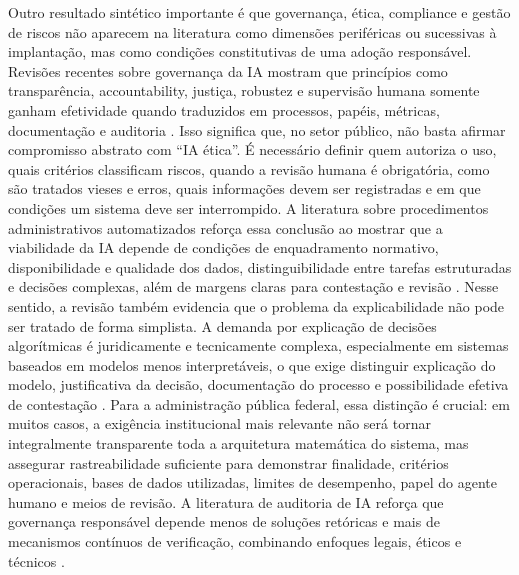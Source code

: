 \documentclass[12pt,a4paper]{article}
\begin{document}
Outro resultado sintético importante é que governança, ética, compliance e gestão de riscos não aparecem na literatura como dimensões periféricas ou sucessivas à implantação, mas como condições constitutivas de uma adoção responsável. Revisões recentes sobre governança da IA mostram que princípios como transparência, accountability, justiça, robustez e supervisão humana somente ganham efetividade quando traduzidos em processos, papéis, métricas, documentação e auditoria \autocite{batool2025ai} \autocite{sigfrids2022how}. Isso significa que, no setor público, não basta afirmar compromisso abstrato com “IA ética”. É necessário definir quem autoriza o uso, quais critérios classificam riscos, quando a revisão humana é obrigatória, como são tratados vieses e erros, quais informações devem ser registradas e em que condições um sistema deve ser interrompido. A literatura sobre procedimentos administrativos automatizados reforça essa conclusão ao mostrar que a viabilidade da IA depende de condições de enquadramento normativo, disponibilidade e qualidade dos dados, distinguibilidade entre tarefas estruturadas e decisões complexas, além de margens claras para contestação e revisão \autocite{parycek2023artificial}.
Nesse sentido, a revisão também evidencia que o problema da explicabilidade não pode ser tratado de forma simplista. A demanda por explicação de decisões algorítmicas é juridicamente e tecnicamente complexa, especialmente em sistemas baseados em modelos menos interpretáveis, o que exige distinguir explicação do modelo, justificativa da decisão, documentação do processo e possibilidade efetiva de contestação \autocite{brkan2020legal}. Para a administração pública federal, essa distinção é crucial: em muitos casos, a exigência institucional mais relevante não será tornar integralmente transparente toda a arquitetura matemática do sistema, mas assegurar rastreabilidade suficiente para demonstrar finalidade, critérios operacionais, bases de dados utilizadas, limites de desempenho, papel do agente humano e meios de revisão. A literatura de auditoria de IA reforça que governança responsável depende menos de soluções retóricas e mais de mecanismos contínuos de verificação, combinando enfoques legais, éticos e técnicos \autocite{mkander2023auditing} \autocite{minkkinen2022continuous}.
\end{document}
